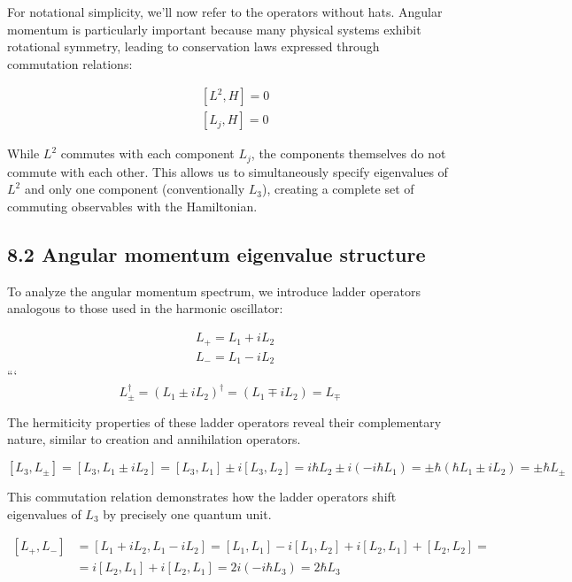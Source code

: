 \documentclass[10pt]{article}
\begin{document}
For notational simplicity, we'll now refer to the operators without hats. Angular momentum is particularly important because many physical systems exhibit rotational symmetry, leading to conservation laws expressed through commutation relations:

\begin{align*}
& {\left[L^{2}, H\right]=0} \\
& {\left[L_{j}, H\right]=0} \tag{8.7}
\end{align*}

While $L^2$ commutes with each component $L_j$, the components themselves do not commute with each other. This allows us to simultaneously specify eigenvalues of $L^2$ and only one component (conventionally $L_3$), creating a complete set of commuting observables with the Hamiltonian.

\subsection*{8.2 Angular momentum eigenvalue structure}
To analyze the angular momentum spectrum, we introduce ladder operators analogous to those used in the harmonic oscillator:

\begin{align*}
& L_{+}=L_{1}+i L_{2} \\
& L_{-}=L_{1}-i L_{2} \tag{8.8}
\end{align*}
```
\begin{equation*}
L_{ \pm}^{\dagger}=\left(L_{1} \pm i L_{2}\right)^{\dagger}=\left(L_{1} \mp i L_{2}\right)=L_{\mp} \tag{8.9}
\end{equation*}

The hermiticity properties of these ladder operators reveal their complementary nature, similar to creation and annihilation operators.

\begin{equation*}
\left[L_{3}, L_{ \pm}\right]=\left[L_{3}, L_{1} \pm i L_{2}\right]=\left[L_{3}, L_{1}\right] \pm i\left[L_{3}, L_{2}\right]=i \hbar L_{2} \pm i\left(-i \hbar L_{1}\right)= \pm \hbar\left(\hbar L_{1} \pm i L_{2}\right)= \pm \hbar L_{ \pm} \tag{8.10}
\end{equation*}

This commutation relation demonstrates how the ladder operators shift eigenvalues of $L_3$ by precisely one quantum unit.

\begin{align*}
{\left[L_{+}, L_{-}\right] } & =\left[L_{1}+i L_{2}, L_{1}-i L_{2}\right]=\left[L_{1}, L_{1}\right]-i\left[L_{1}, L_{2}\right]+i\left[L_{2}, L_{1}\right]+\left[L_{2}, L_{2}\right]= \\
& =i\left[L_{2}, L_{1}\right]+i\left[L_{2}, L_{1}\right]=2 i\left(-i \hbar L_{3}\right)=2 \hbar L_{3} \tag{8.11}
\end{align*}
\end{document}
